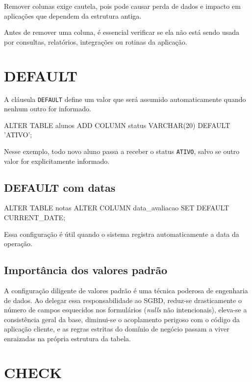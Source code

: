 Remover colunas exige cautela, pois pode causar perda de dados e impacto em aplicações que dependem da estrutura antiga.

\begin{danger}
Antes de remover uma coluna, é essencial verificar se ela não está sendo usada por consultas, relatórios, integrações ou rotinas da aplicação.
\end{danger}

\section{DEFAULT}

A cláusula \texttt{DEFAULT} define um valor que será assumido automaticamente quando nenhum outro for informado.

\begin{sqlcode}
ALTER TABLE alunos
ADD COLUMN status VARCHAR(20) DEFAULT 'ATIVO';
\end{sqlcode}

Nesse exemplo, todo novo aluno passa a receber o status \texttt{ATIVO}, salvo se outro valor for explicitamente informado.

\subsection{DEFAULT com datas}

\begin{sqlcode}
ALTER TABLE notas
ALTER COLUMN data_avaliacao SET DEFAULT CURRENT_DATE;
\end{sqlcode}

Essa configuração é útil quando o sistema registra automaticamente a data da operação.

\subsection{Importância dos valores padrão}

A configuração diligente de valores padrão é uma técnica poderosa de engenharia de dados. Ao delegar essa responsabilidade ao SGBD, reduz-se drasticamente o número de campos esquecidos nos formulários (\textit{nulls} não intencionais), eleva-se a consistência geral da base, diminui-se o acoplamento perigoso com o código da aplicação cliente, e as regras estritas do domínio de negócio passam a viver enraizadas na própria estrutura da tabela.

\section{CHECK}

